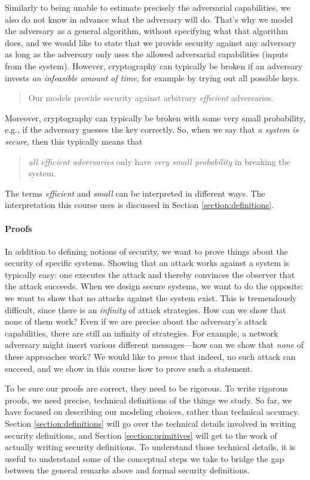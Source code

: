 Similarly to being unable to estimate precisely the adversarial capabilities, we also do not know in advance what the adversary will do.
That's why we model the adversary as a general algorithm, without specifying what that algorithm does, and we would like to state that we provide security against any adversary as long as the adversary only uses the allowed adversarial capabilities (inputs from the system).
However, cryptography can typically be broken if an adversary invests \emph{an infeasible amount of time}, for example by trying out all possible keys.

\begin{quote}
    Our models provide security against arbitrary \emph{efficient} adversaries.
\end{quote}
Moreover, cryptography can typically be broken with some very small probability, e.g., if the adversary guesses the key correctly.
So, when we say that \emph{a system is secure}, then this typically means that

\begin{quote}
    \emph{all efficient
        adversaries} only have \emph{very small probability} in breaking the system.
\end{quote}
The terms \emph{efficient} and \emph{small} can be interpreted in different ways.
The interpretation this course uses is discussed in Section \ref{section:definitions}.

\paragraph{Proofs}
In addition to defining notions of security, we want to prove things about the security of specific systems.
Showing that an attack works against a system is typically easy: one executes the attack and thereby
convinces the observer that the attack succeeds.
When we design secure systems, we want to do the opposite: we want to show that no attacks against the system exist.
This is tremendously difficult, since there is an \emph{infinity} of attack strategies.
How can we show that none of them work?
Even if we are precise about the adversary's attack capabilities, there are still an infinity of
strategies.
For example, a network adversary might insert various different messages---how can
we show that \emph{none} of these approaches work?
We would like to \emph{prove} that indeed, no such attack can succeed, and we show in this course
how to prove such a statement.

To be sure our proofs are correct, they need to be rigorous.
To write rigorous proofs, we need precise, technical definitions of the things we study.
So far, we have focused on describing our modeling choices, rather than technical accuracy.
Section \ref{section:definitions} will go over the technical details involved in writing security definitions, and Section \ref{section:primitives} will get to the work of actually writing security definitions.
To understand those technical details, it is useful to understand some of the conceptual steps we take to bridge the gap between the general remarks above and formal security definitions.

